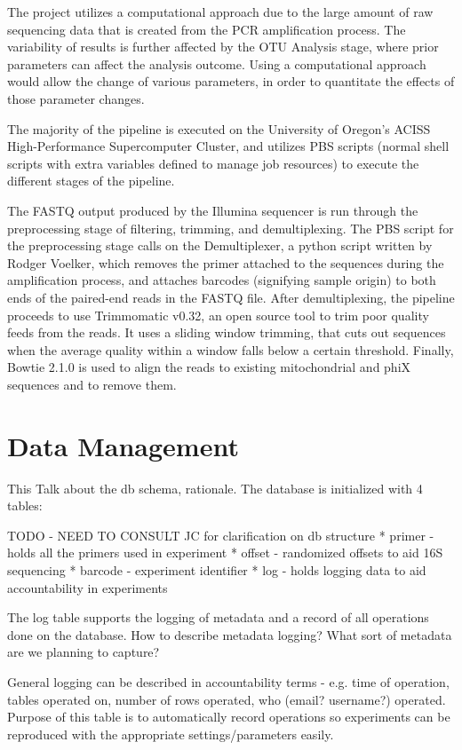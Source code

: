 \documentclass[12pt]{article}
\begin{document}
	The project utilizes a computational approach due to the large amount of raw sequencing data that is created from the PCR amplification process. The variability of results is further affected by the OTU Analysis stage, where prior parameters can affect the analysis outcome. Using a computational approach would allow the change of various parameters, in order to quantitate the effects of those parameter changes.

	The majority of the pipeline is executed on the University of Oregon’s ACISS High-Performance Supercomputer Cluster, and utilizes PBS scripts (normal shell scripts with extra variables defined to manage job resources) to execute the different stages of the pipeline.

	The FASTQ output produced by the Illumina sequencer is run through the preprocessing stage of filtering, trimming, and demultiplexing. The PBS script for the preprocessing stage calls on the Demultiplexer, a python script written by Rodger Voelker, which removes the primer attached to the sequences during the amplification process, and attaches barcodes (signifying sample origin) to both ends of the paired-end reads in the FASTQ file. After demultiplexing, the pipeline proceeds to use Trimmomatic v0.32, an open source tool to trim poor quality feeds from the reads. It uses a sliding window trimming, that cuts out sequences when the average quality within a window falls below a certain threshold. Finally, Bowtie 2.1.0 is used to align the reads to existing mitochondrial and phiX sequences and to remove them.
	
	\section{Data Management} %
	\label{sec:data_management}
	This 
	Talk about the db schema, rationale.
	The database is initialized with 4 tables:

	TODO - NEED TO CONSULT JC for clarification on db structure
	* primer - holds all the primers used in experiment
	* offset - randomized offsets to aid 16S sequencing
	* barcode - experiment identifier
	* log - holds logging data to aid accountability in experiments

	The log table supports the logging of metadata and a record of all operations done on the database.
	How to describe metadata logging? What sort of metadata are we planning to capture?

	General logging can be described in accountability terms - e.g. time of operation, tables operated on,
	number of rows operated, who (email? username?) operated. Purpose of this table
	is to automatically record operations so experiments can be reproduced with the
	appropriate settings/parameters easily.
\end{document}
